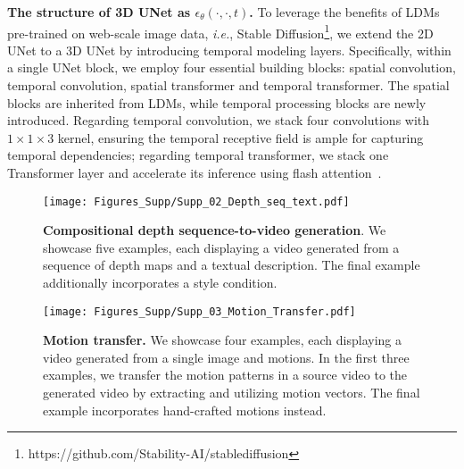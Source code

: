 \textbf{The structure of 3D UNet as $\epsilon_{\theta}(\cdot, \cdot, t)$.}
To leverage the benefits of LDMs pre-trained on web-scale image data, \textit{i.e.}, Stable Diffusion\footnote{https://github.com/Stability-AI/stablediffusion}, we extend the 2D UNet to a 3D UNet by introducing temporal modeling layers.
Specifically, within a single UNet block, we employ four essential building blocks: spatial convolution, temporal convolution, spatial transformer and temporal transformer.
The spatial blocks are inherited from LDMs, while temporal processing blocks are newly introduced.
Regarding temporal convolution, we stack four convolutions with $1 \times 1 \times 3$ kernel, ensuring the temporal receptive field is ample for capturing temporal dependencies;
regarding temporal transformer, we stack one Transformer layer 
and accelerate its inference using flash attention~\cite{dao2022flashattention}.













\begin{figure}[t]
    \centering
    \texttt{[image: Figures\_Supp/Supp\_02\_Depth\_seq\_text.pdf]}
     \vspace{-1.5em}
    \caption{
    \small
    \textbf{Compositional depth sequence-to-video generation}.
    We showcase five examples, each displaying a video generated from a sequence of depth maps and a textual description.
    The final example additionally incorporates a style condition.
    }
    \label{fig:depth_sequence}
    \vspace{-5mm}
\end{figure}




\begin{figure}[t]
    \centering
    \texttt{[image: Figures\_Supp/Supp\_03\_Motion\_Transfer.pdf]}
     \vspace{-1.5em}
    \caption{
    \small
    \textbf{Motion transfer.}
We showcase four examples, each displaying a video generated from a single image and motions.
In the first three examples, we transfer the motion patterns in a source video to the generated video by extracting and utilizing motion vectors.
The final example incorporates hand-crafted motions instead.
    }
    \label{fig:motion_transfer}
    \vspace{-5mm}
\end{figure}


